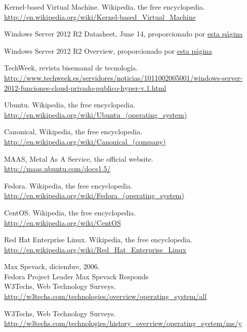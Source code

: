 \begin{thebibliography}{10}
Kernel-based Virtual Machine. Wikipedia, the free encyclopedia.\\
  \url{http://en.wikipedia.org/wiki/Kernel-based_Virtual_Machine}

Windows Server 2012 R2 Datasheet, June 14, proporcionado por
\href{http://www.microsoft.com/es-es/server-cloud/products/windows-server-2012-r2/}{esta página}

Windows Server 2012 R2 Overview, proporcionado por
\href{http://www.microsoft.com/es-es/server-cloud/products/windows-server-2012-r2/}{esta página}

TechWeek, revista bisemanal de tecnología.\\
  \url{http://www.techweek.es/servidores/noticias/1011002005001/windows-server-2012-funciones-cloud-privado-publico-hyper-v.1.html}

Ubuntu. Wikipedia, the free encyclopedia.\\
  \url{http://en.wikipedia.org/wiki/Ubuntu_(operating_system)}

Canonical. Wikipedia, the free encyclopedia.\\
  \url{http://en.wikipedia.org/wiki/Canonical_(company)}

MAAS, Metal As A Service, the official website.\\
  \url{http://maas.ubuntu.com/docs1.5/}

Fedora. Wikipedia, the free encyclopedia.\\
  \url{http://en.wikipedia.org/wiki/Fedora_(operating_system)}

CentOS. Wikipedia, the free encyclopedia.\\
  \url{http://en.wikipedia.org/wiki/CentOS}

Red Hat Enterprise Linux. Wikipedia, the free encyclopedia.\\
  \url{http://en.wikipedia.org/wiki/Red_Hat_Enterprise_Linux}

Max Spevack, diciembre, 2006.\\
  Fedora Project Leader Max Spevack Responds\\

W3Techs, Web Technology Surveys.\\
  \url{http://w3techs.com/technologies/overview/operating_system/all}

W3Techs, Web Technology Surveys.\\
  \url{http://w3techs.com/technologies/history_overview/operating_system/ms/y}


\end{thebibliography}
